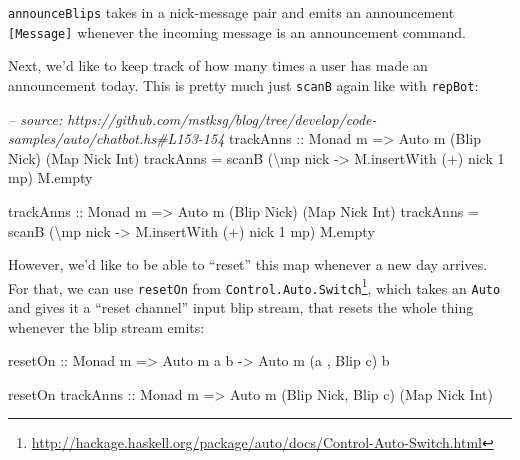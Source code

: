 \documentclass[]{article}
\newenvironment{Shaded}{}{}
\newcommand{\DataTypeTok}[1]{\textcolor[rgb]{0.56,0.13,0.00}{{#1}}}
\newcommand{\DecValTok}[1]{\textcolor[rgb]{0.25,0.63,0.44}{{#1}}}
\newcommand{\CommentTok}[1]{\textcolor[rgb]{0.38,0.63,0.69}{\textit{{#1}}}}
\newcommand{\OtherTok}[1]{\textcolor[rgb]{0.00,0.44,0.13}{{#1}}}
\newcommand{\FunctionTok}[1]{\textcolor[rgb]{0.02,0.16,0.49}{{#1}}}
\newcommand{\NormalTok}[1]{{#1}}
\renewcommand{\href}[2]{#2\footnote{\url{#1}}}
\begin{document}
\texttt{announceBlips} takes in a nick-message pair and emits an announcement \texttt{{[}Message{]}}
whenever the incoming message is an announcement command.

Next, we'd like to keep track of how many times a user has made an announcement today. This is
pretty much just \texttt{scanB} again like with \texttt{repBot}:

\begin{Shaded}
\begin{Highlighting}[]
\CommentTok{-- source: https://github.com/mstksg/blog/tree/develop/code-samples/auto/chatbot.hs#L153-154}
\OtherTok{    trackAnns ::} \DataTypeTok{Monad} \NormalTok{m }\OtherTok{=>} \DataTypeTok{Auto} \NormalTok{m (}\DataTypeTok{Blip} \DataTypeTok{Nick}\NormalTok{) (}\DataTypeTok{Map} \DataTypeTok{Nick} \DataTypeTok{Int}\NormalTok{)}
    \NormalTok{trackAnns }\FunctionTok{=} \NormalTok{scanB (\textbackslash{}mp nick }\OtherTok{->} \NormalTok{M.insertWith (}\FunctionTok{+}\NormalTok{) nick }\DecValTok{1} \NormalTok{mp) M.empty}



\OtherTok{trackAnns ::} \DataTypeTok{Monad} \NormalTok{m }\OtherTok{=>} \DataTypeTok{Auto} \NormalTok{m (}\DataTypeTok{Blip} \DataTypeTok{Nick}\NormalTok{) (}\DataTypeTok{Map} \DataTypeTok{Nick} \DataTypeTok{Int}\NormalTok{)}
\NormalTok{trackAnns }\FunctionTok{=} \NormalTok{scanB (\textbackslash{}mp nick }\OtherTok{->} \NormalTok{M.insertWith (}\FunctionTok{+}\NormalTok{) nick }\DecValTok{1} \NormalTok{mp) M.empty}
\end{Highlighting}
\end{Shaded}

However, we'd like to be able to ``reset'' this map whenever a new day arrives. For that, we can use
\texttt{resetOn} from
\href{http://hackage.haskell.org/package/auto/docs/Control-Auto-Switch.html}{\texttt{Control.Auto.Switch}},
which takes an \texttt{Auto} and gives it a ``reset channel'' input blip stream, that resets the
whole thing whenever the blip stream emits:

\begin{Shaded}
\begin{Highlighting}[]
\OtherTok{resetOn ::} \DataTypeTok{Monad} \NormalTok{m }\OtherTok{=>} \DataTypeTok{Auto} \NormalTok{m a b }\OtherTok{->} \DataTypeTok{Auto} \NormalTok{m (a        , }\DataTypeTok{Blip} \NormalTok{c) b}

\NormalTok{resetOn}\OtherTok{ trackAnns ::} \DataTypeTok{Monad} \NormalTok{m }\OtherTok{=>}     \DataTypeTok{Auto} \NormalTok{m (}\DataTypeTok{Blip} \DataTypeTok{Nick}\NormalTok{, }\DataTypeTok{Blip} \NormalTok{c) (}\DataTypeTok{Map} \DataTypeTok{Nick} \DataTypeTok{Int}\NormalTok{)}
\end{Highlighting}
\end{Shaded}
\end{document}
